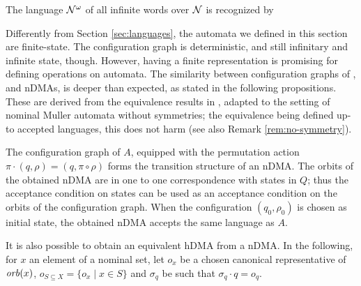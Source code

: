 \begin{example}
The language $\mathcal{N}^\omega$ of all infinite words over $\mathcal{N}$ is recognized by

\centering
{}
\end{example}
%
Differently from Section \ref{sec:languages}, the automata we defined in this section are finite-state. The configuration graph is deterministic, and still infinitary and infinite state,
%
%
though. 
However, having a finite representation is promising for defining operations on automata. The similarity between configuration graphs of \hdmas, and nDMAs, is deeper than expected, as stated in the following propositions. These are derived from the equivalence results in \cite{GADDUCCIETAL,STATON}, adapted to the setting of nominal Muller automata without symmetries; the equivalence being defined up-to accepted languages, this does not harm (see also Remark \ref{rem:no-symmetry}).

\begin{proposition}
 The configuration graph of $A$, equipped with the permutation action $\pi \cdot (q,\rho) = (q,\pi \circ \rho)$ forms the transition structure of an nDMA. The orbits of the obtained nDMA are in one to one correspondence with states in $Q$; thus the acceptance condition on states can be used as an acceptance condition on the orbits of the configuration graph. When the configuration $(q_0,\rho_0)$ is chosen as initial state, the obtained nDMA accepts the same language as $A$.
\end{proposition}

It is also possible to obtain an equivalent hDMA from a nDMA. In the following, for $x$ an element of a nominal set, let $o_x$ be a chosen canonical representative of $\mathit{orb}(x)$, $o_{S \subseteq X} = \{o_x \mid x \in S\}$ and $\sigma_q$ be such that $\sigma_q \cdot q = o_q$. 

